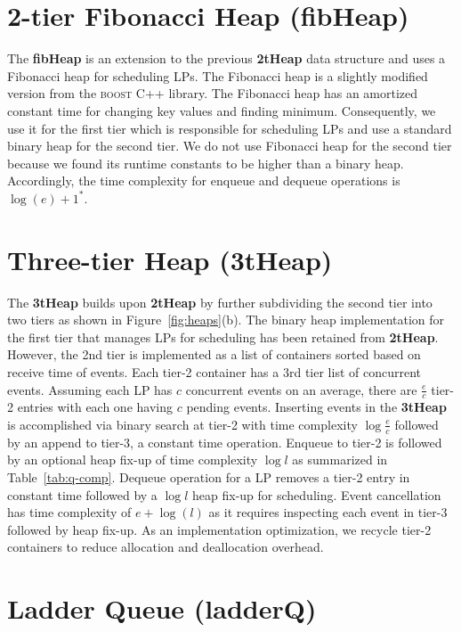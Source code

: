 \section{2-tier Fibonacci Heap (fibHeap)} 
The \textbf{fibHeap} is an extension to the previous \textbf{2tHeap} data structure and uses a Fibonacci heap for scheduling LPs. The Fibonacci heap is a slightly modified version from the \textsc{boost} C++ library. The Fibonacci heap has an amortized constant time for changing key values and finding minimum. Consequently, we use it for the first tier which is responsible for scheduling LPs and use a standard binary heap for the second tier.  We do not use Fibonacci heap for the second tier because we found its runtime constants to be higher than a binary heap.  Accordingly, the time complexity for enqueue and dequeue operations is $\log(e) + 1^{*}$.

\section{Three-tier Heap (3tHeap)} 
The \textbf{3tHeap} builds upon \textbf{2tHeap} by further subdividing the second tier into two tiers as shown in Figure~\ref{fig:heaps}(b). The binary heap implementation for the first tier that manages LPs for scheduling has been retained from \textbf{2tHeap}. However, the 2nd tier is implemented as a list of containers sorted based on receive time of events. Each tier-2 container has a 3rd tier list of concurrent events. Assuming each LP has $c$ concurrent events on an average, there are $\frac{e}{c}$ tier-2 entries with each one having $c$ pending events. Inserting events in the \textbf{3tHeap} is accomplished via binary search at tier-2 with time complexity $\log\frac{e}{c}$ followed by an append to tier-3, a constant time operation. Enqueue to tier-2 is followed by an optional heap fix-up of time complexity $\log l$ as summarized in Table~\ref{tab:q-comp}. Dequeue operation for a LP removes a tier-2 entry in constant time followed by a $\log l$ heap fix-up for scheduling. Event cancellation has time complexity of $e + \log(l)$ as it requires inspecting each event in tier-3 followed by heap fix-up. As an implementation optimization, we recycle tier-2 containers to reduce allocation and deallocation overhead.

\section{Ladder Queue (ladderQ)} 


